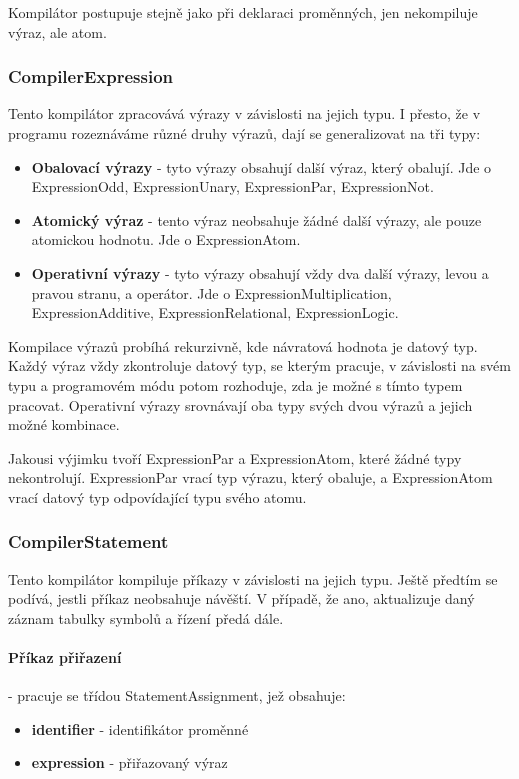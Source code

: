 \documentclass[
12pt,
a4paper,
pdftex,
czech,
titlepage
]{report}
\begin{document}
Kompilátor postupuje stejně jako při deklaraci proměnných, jen nekompiluje výraz, ale atom.

\subsubsection{CompilerExpression}

Tento kompilátor zpracovává výrazy v závislosti na jejich typu. I přesto, že v programu rozeznáváme různé druhy výrazů, dají se generalizovat na tři typy:
\begin{itemize}
\item \textbf{Obalovací výrazy} - tyto výrazy obsahují další výraz, který obalují. Jde o ExpressionOdd, ExpressionUnary, ExpressionPar, ExpressionNot.
\item \textbf{Atomický výraz} - tento výraz neobsahuje žádné další výrazy, ale pouze atomickou hodnotu. Jde o ExpressionAtom.
\item \textbf{Operativní výrazy} - tyto výrazy obsahují vždy dva další výrazy, levou a pravou stranu, a operátor. Jde o ExpressionMultiplication, ExpressionAdditive, ExpressionRelational, ExpressionLogic.
\end{itemize}

Kompilace výrazů probíhá rekurzivně, kde návratová hodnota je datový typ. Každý výraz vždy zkontroluje datový typ, se kterým pracuje, v závislosti na svém typu a programovém módu potom rozhoduje, zda je možné s tímto typem pracovat. Operativní výrazy srovnávají oba typy svých dvou výrazů a jejich možné kombinace.

Jakousi výjimku tvoří ExpressionPar a ExpressionAtom, které žádné typy nekontrolují. ExpressionPar vrací typ výrazu, který obaluje, a ExpressionAtom vrací datový typ odpovídající typu svého atomu.

\subsubsection{CompilerStatement}
Tento kompilátor kompiluje příkazy v závislosti na jejich typu. Ještě předtím se podívá, jestli příkaz neobsahuje návěští. V případě, že ano, aktualizuje daný záznam tabulky symbolů a řízení předá dále.

\paragraph{Příkaz přiřazení} - pracuje se třídou StatementAssignment, jež obsahuje:
\begin{itemize}
\item \textbf{identifier} - identifikátor proměnné
\item \textbf{expression} - přiřazovaný výraz
\end{itemize}
\end{document}
